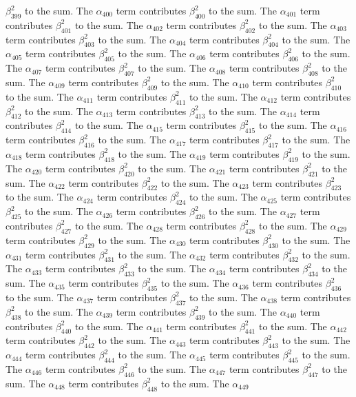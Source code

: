 \begin{lemma}
$\beta_{399}^{2}$ to the sum. The $\alpha_{400}$ term contributes $\beta_{400}^{2}$ to the sum. The $\alpha_{401}$ term contributes $\beta_{401}^{2}$ to the sum. The $\alpha_{402}$ term contributes $\beta_{402}^{2}$ to the sum. The $\alpha_{403}$ term contributes $\beta_{403}^{2}$ to the sum. The $\alpha_{404}$ term contributes $\beta_{404}^{2}$ to the sum. The $\alpha_{405}$ term contributes $\beta_{405}^{2}$ to the sum. The $\alpha_{406}$ term contributes $\beta_{406}^{2}$ to the sum. The $\alpha_{407}$ term contributes $\beta_{407}^{2}$ to the sum. The $\alpha_{408}$ term contributes $\beta_{408}^{2}$ to the sum. The $\alpha_{409}$ term contributes $\beta_{409}^{2}$ to the sum. The $\alpha_{410}$ term contributes $\beta_{410}^{2}$ to the sum. The $\alpha_{411}$ term contributes $\beta_{411}^{2}$ to the sum. The $\alpha_{412}$ term contributes $\beta_{412}^{2}$ to the sum. The $\alpha_{413}$ term contributes $\beta_{413}^{2}$ to the sum. The $\alpha_{414}$ term contributes $\beta_{414}^{2}$ to the sum. The $\alpha_{415}$ term contributes $\beta_{415}^{2}$ to the sum. The $\alpha_{416}$ term contributes $\beta_{416}^{2}$ to the sum. The $\alpha_{417}$ term contributes $\beta_{417}^{2}$ to the sum. The $\alpha_{418}$ term contributes $\beta_{418}^{2}$ to the sum. The $\alpha_{419}$ term contributes $\beta_{419}^{2}$ to the sum. The $\alpha_{420}$ term contributes $\beta_{420}^{2}$ to the sum. The $\alpha_{421}$ term contributes $\beta_{421}^{2}$ to the sum. The $\alpha_{422}$ term contributes $\beta_{422}^{2}$ to the sum. The $\alpha_{423}$ term contributes $\beta_{423}^{2}$ to the sum. The $\alpha_{424}$ term contributes $\beta_{424}^{2}$ to the sum. The $\alpha_{425}$ term contributes $\beta_{425}^{2}$ to the sum. The $\alpha_{426}$ term contributes $\beta_{426}^{2}$ to the sum. The $\alpha_{427}$ term contributes $\beta_{427}^{2}$ to the sum. The $\alpha_{428}$ term contributes $\beta_{428}^{2}$ to the sum. The $\alpha_{429}$ term contributes $\beta_{429}^{2}$ to the sum. The $\alpha_{430}$ term contributes $\beta_{430}^{2}$ to the sum. The $\alpha_{431}$ term contributes $\beta_{431}^{2}$ to the sum. The $\alpha_{432}$ term contributes $\beta_{432}^{2}$ to the sum. The $\alpha_{433}$ term contributes $\beta_{433}^{2}$ to the sum. The $\alpha_{434}$ term contributes $\beta_{434}^{2}$ to the sum. The $\alpha_{435}$ term contributes $\beta_{435}^{2}$ to the sum. The $\alpha_{436}$ term contributes $\beta_{436}^{2}$ to the sum. The $\alpha_{437}$ term contributes $\beta_{437}^{2}$ to the sum. The $\alpha_{438}$ term contributes $\beta_{438}^{2}$ to the sum. The $\alpha_{439}$ term contributes $\beta_{439}^{2}$ to the sum. The $\alpha_{440}$ term contributes $\beta_{440}^{2}$ to the sum. The $\alpha_{441}$ term contributes $\beta_{441}^{2}$ to the sum. The $\alpha_{442}$ term contributes $\beta_{442}^{2}$ to the sum. The $\alpha_{443}$ term contributes $\beta_{443}^{2}$ to the sum. The $\alpha_{444}$ term contributes $\beta_{444}^{2}$ to the sum. The $\alpha_{445}$ term contributes $\beta_{445}^{2}$ to the sum. The $\alpha_{446}$ term contributes $\beta_{446}^{2}$ to the sum. The $\alpha_{447}$ term contributes $\beta_{447}^{2}$ to the sum. The $\alpha_{448}$ term contributes $\beta_{448}^{2}$ to the sum. The $\alpha_{449}$ 
\end{lemma}
